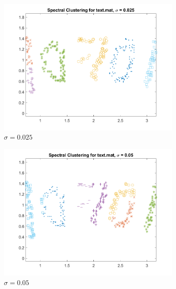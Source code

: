 \documentclass[11pt]{article}
\begin{document}
\begin{figure}[!ht]
    \centering
    \begin{subfigure}{0.45\textwidth}
        \includegraphics[width=\linewidth]{text_sigma_0.025.png}
        \caption{\(\sigma = 0.025\)}
    \end{subfigure}
    \begin{subfigure}{0.45\textwidth}
        \includegraphics[width=\linewidth]{text_sigma_0.050.png}
        \caption{\(\sigma = 0.05\)}
    \end{subfigure}
    \begin{subfigure}{0.45\textwidth}

\end{subfigure}
\end{figure}
\end{document}
